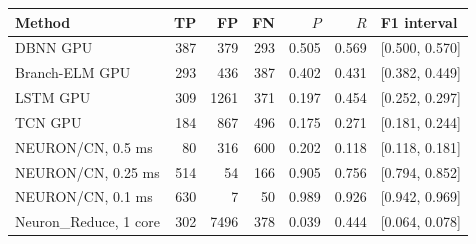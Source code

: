 \begin{tabular}{lrrrrrl}
\toprule
Method & TP & FP & FN & $P$ & $R$ & F1 interval\\
\midrule
DBNN GPU & 387 & 379 & 293 & 0.505 & 0.569 & [0.500, 0.570] \\
Branch-ELM GPU & 293 & 436 & 387 & 0.402 & 0.431 & [0.382, 0.449] \\
LSTM GPU & 309 & 1261 & 371 & 0.197 & 0.454 & [0.252, 0.297] \\
TCN GPU & 184 & 867 & 496 & 0.175 & 0.271 & [0.181, 0.244] \\
NEURON/CN, 0.5 ms & 80 & 316 & 600 & 0.202 & 0.118 & [0.118, 0.181] \\
NEURON/CN, 0.25 ms & 514 & 54 & 166 & 0.905 & 0.756 & [0.794, 0.852] \\
NEURON/CN, 0.1 ms & 630 & 7 & 50 & 0.989 & 0.926 & [0.942, 0.969] \\
Neuron\_Reduce, 1 core & 302 & 7496 & 378 & 0.039 & 0.444 & [0.064, 0.078] \\
\bottomrule
\end{tabular}
